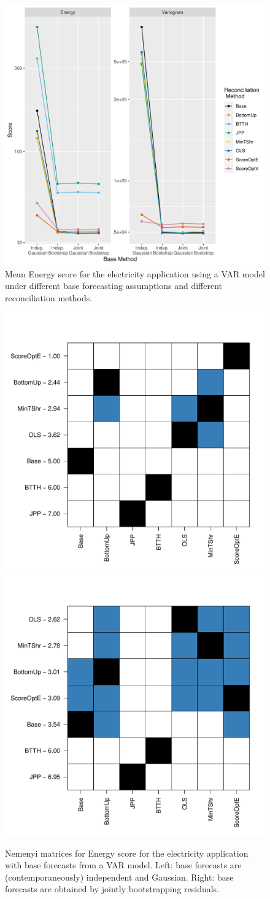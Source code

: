 \documentclass[a4paper,12pt]{article}
\theoremstyle{definition}
\begin{document}
\begin{figure}[!htb]
	\centering
	\includegraphics[width=.4\textheight]{meanenergyscore_VAR}
	\caption{Mean Energy score for the electricity application using a VAR model under different base forecasting assumptions and different reconciliation methods.}\label{fig:meanenergy_app_var}
\end{figure}

\begin{figure}[!htb]
	\centerline{\includegraphics[width=.3\textwidth]{nemenyi_ig_VAR.pdf}\includegraphics[width=.3\textwidth]{nemenyi_jb_VAR.pdf}}
	\caption{Nemenyi matrices for Energy score for the electricity application with base forecasts from a VAR model. Left: base forecasts are (contemporaneously) independent and Gaussian. Right: base forecasts are obtained by jointly bootstrapping residuals.}\label{fig:nem_app_var}
\end{figure}
\end{document}
